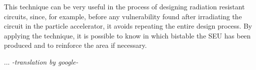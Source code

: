 This technique can be very useful in the process of designing radiation resistant 
circuits, since, for example, before any vulnerability found after irradiating the 
circuit in the particle accelerator, it avoids repeating the entire design process.
By applying the technique, it is possible to know in which bistable the SEU has 
been produced and to reinforce the area if necessary.



...
\emph{-translation by google-}

